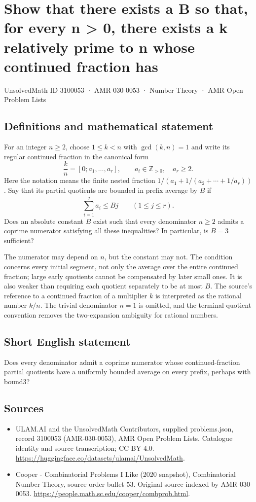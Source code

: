 \documentclass[11pt,a4paper]{article}
\begin{document}
\section*{Show that there exists a B so that, for every n > 0, there exists a k relatively prime to n whose continued fraction has}\label{3100053}
{\small UnsolvedMath ID 3100053 · AMR-030-0053 · Number Theory · AMR Open Problem Lists}
\subsection{Definitions and mathematical statement}
For an integer $n\ge2$, choose $1\le k<n$ with $\gcd(k,n)=1$
and write its regular continued fraction in the canonical form
\[
       \frac{k}{n}=[0;a_1,\ldots,a_r],
       \qquad a_i\in\mathbb Z_{>0},\quad a_r\ge2.
\]
Here the notation means the finite nested fraction
$1/(a_1+1/(a_2+\cdots+1/a_r))$. Say that its partial quotients
are bounded in prefix average by $B$ if
\[
                    \sum_{i=1}^{j}a_i\le Bj
                         \qquad(1\le j\le r).
\]
Does an absolute constant $B$ exist such that every denominator
$n\ge2$ admits a coprime numerator satisfying all these inequalities?
In particular, is $B=3$ sufficient?

The numerator may depend on $n$, but the constant may not. The
condition concerns every initial segment, not only the average
over the entire continued fraction; large early quotients cannot
be compensated by later small ones. It is also weaker than
requiring each quotient separately to be at most $B$.
The source's reference to a continued fraction of a multiplier
$k$ is interpreted as the rational number $k/n$. The trivial
denominator $n=1$ is omitted, and the terminal-quotient convention
removes the two-expansion ambiguity for rational numbers.
\subsection{Short English statement}
Does every denominator admit a coprime numerator whose continued-fraction partial quotients have a uniformly bounded average on every prefix, perhaps with bound3?
\subsection{Sources}
\begin{itemize}
\item[S1] ULAM.AI and the UnsolvedMath Contributors, supplied problems.json, record 3100053 (AMR-030-0053), AMR Open Problem Lists. Catalogue identity and source transcription; CC BY 4.0.
\url{https://huggingface.co/datasets/ulamai/UnsolvedMath}.
\item[S2] Cooper - Combinatorial Problems I Like (2020 snapshot), Combinatorial Number Theory, source-order bullet 53. Original source indexed by AMR-030-0053.
\url{https://people.math.sc.edu/cooper/combprob.html}.
\end{itemize}
\end{document}
